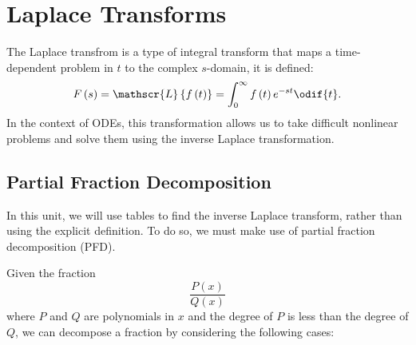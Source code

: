\documentclass{article}
\begin{document}
\newpage
\section{Laplace Transforms}
The Laplace transfrom is a type of integral transform that maps
a time-dependent problem in \(t\) to the complex \(s\)-domain, it is defined:
\begin{equation*}
    F\left( s \right) = \mathscr{L}\left\{ f\left( t \right) \right\} = \int_0^\infty f\left( t \right) e^{-st} \odif{t}.
\end{equation*}
In the context of ODEs, this transformation allows us to take difficult nonlinear problems and solve them
using the inverse Laplace transformation.
\subsection{Partial Fraction Decomposition}
In this unit, we will use tables to find the inverse Laplace transform, rather than using the
explicit definition. To do so, we must make use of partial fraction decomposition (PFD).

Given the fraction
\begin{equation*}
    \frac{P\left( x \right)}{Q\left( x \right)}
\end{equation*}
where \(P\) and \(Q\) are polynomials in \(x\) and the degree of \(P\) is less than the degree of \(Q\),
we can decompose a fraction by considering the following cases:
\end{document}
